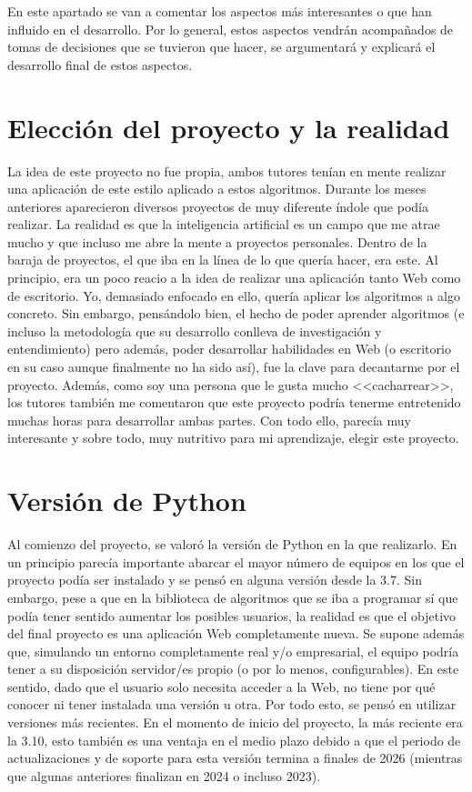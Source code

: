 
En este apartado se van a comentar los aspectos más interesantes o que han
influido en el desarrollo. Por lo general, estos aspectos vendrán acompañados de
tomas de decisiones que se tuvieron que hacer, se argumentará y explicará el
desarrollo final de estos aspectos.

\section{Elección del proyecto y la realidad}

La idea de este proyecto no fue propia, ambos tutores tenían en mente realizar
una aplicación de este estilo aplicado a estos algoritmos. Durante los meses
anteriores aparecieron diversos proyectos de muy diferente índole que podía
realizar. La realidad es que la inteligencia artificial es un campo que me atrae
mucho y que incluso me abre la mente a proyectos personales. Dentro de la baraja
de proyectos, el que iba en la línea de lo que quería hacer, era este. Al
principio, era un poco reacio a la idea de realizar una aplicación tanto Web
como de escritorio. Yo, demasiado enfocado en ello, quería aplicar los
algoritmos a algo concreto. Sin embargo, pensándolo bien, el hecho de poder
aprender algoritmos (e incluso la metodología que su desarrollo conlleva de
investigación y entendimiento) pero además, poder desarrollar habilidades en Web
(o escritorio en su caso aunque finalmente no ha sido así), fue la clave para
decantarme por el proyecto. Además, como soy una persona que le gusta mucho
<<cacharrear>>, los tutores también me comentaron que este proyecto podría
tenerme entretenido muchas horas para desarrollar ambas partes. Con todo ello,
parecía muy interesante y sobre todo, muy nutritivo para mi aprendizaje, elegir
este proyecto.

\section{Versión de Python}

Al comienzo del proyecto, se valoró la versión de Python en la que realizarlo.
En un principio parecía importante abarcar el mayor número de equipos en los que
el proyecto podía ser instalado y se pensó en alguna versión desde la 3.7. Sin
embargo, pese a que en la biblioteca de algoritmos que se iba a programar sí que
podía tener sentido aumentar los posibles usuarios, la realidad es que el
objetivo del final proyecto es una aplicación Web completamente nueva. Se supone
además que, simulando un entorno completamente real y/o empresarial, el equipo
podría tener a su disposición servidor/es propio (o por lo menos,
configurables). En este sentido, dado que el usuario solo necesita acceder a la
Web, no tiene por qué conocer ni tener instalada una versión u otra. Por todo
esto, se pensó en utilizar versiones más recientes. En el momento de inicio del
proyecto, la más reciente era la 3.10, esto también es una ventaja en el medio
plazo debido a que el periodo de actualizaciones y de soporte para esta versión
termina a finales de 2026 (mientras que algunas anteriores finalizan en 2024 o
incluso 2023).

